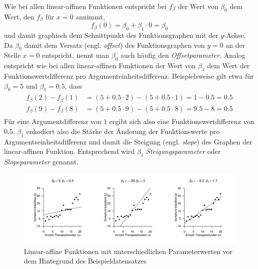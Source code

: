 \documentclass[
  letterpaper,
  DIV=11]{scrartcl}
\theoremstyle{plain}
\theoremstyle{definition}
\theoremstyle{remark}
\begin{document}
Wie bei allen linear-affinen Funktionen entspricht bei \(f_\beta\) der
Wert von \(\beta_0\) dem Wert, den \(f_\beta\) für \(x = 0\) annimmt,
\begin{equation}
f_\beta(0) = \beta_0 + \beta_1\cdot0 = \beta_0
\end{equation} und damit graphisch dem Schnittpunkt des Funktionsgraphen
mit der \(y\)-Achse. Da \(\beta_0\) damit dem Versatz (engl.
\emph{offset}) des Funktionsgraphen von \(y = 0\) an der Stelle
\(x = 0\) entspricht, nennt man \(\beta_0\) auch häufig den
\emph{Offsetparameter}. Analog entspricht wie bei allen linear-affinen
Funktionen der Wert von \(\beta_1\) dem Wert der Funktionswertdifferenz
pro Argumenteinheitsdifferenz. Beispielsweise gilt etwa für
\(\beta_0 = 5\) und \(\beta_1 = 0.5\), dass \begin{align}
\begin{split}
f_\beta(2) - f_\beta(1) & =  (5 + 0.5\cdot2)  - (5 + 0.5\cdot1) = 1 - 0.5 = 0.5 \\
f_\beta(9) - f_\beta(8) & =  (5 + 0.5\cdot 9) - (5 + 0.5\cdot8) = 9.5 - 8 = 0.5
\end{split}
\end{align} Für eine Argumentdifferenz von \(1\) ergibt sich also eine
Funktionswertdifferenz von \(0.5\). \(\beta_1\) enkodiert also die
Stärke der Änderung der Funktionswerte pro Argumentseinheitsdifferenz
und damit die Steigung (engl. \emph{slope}) des Graphen der
linear-affinen Funktion. Entsprechend wird \(\beta_1\)
\emph{Steigungsparameter} oder \emph{Slopeparameter} genannt.

\begin{figure}

{\centering \includegraphics[width=1\textwidth,height=\textheight]{./Abbildungen/reg_linear_affine_funktionen.pdf}

}

\caption{\label{fig-linear-affine-funktionen}Linear-affine Funktionen
mit unterschiedlichen Parameterwerten vor dem Hintegrund des
Beispieldatensatzes}

\end{figure}
\end{document}
